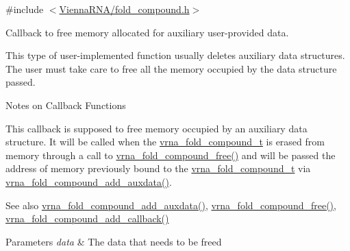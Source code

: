 {\ttfamily \#include $<$\mbox{\hyperlink{fold__compound_8h}{Vienna\+R\+N\+A/fold\+\_\+compound.\+h}}$>$}



Callback to free memory allocated for auxiliary user-\/provided data. 

This type of user-\/implemented function usually deletes auxiliary data structures. The user must take care to free all the memory occupied by the data structure passed.

\begin{DoxyRefDesc}{Notes on Callback Functions}
\item[\mbox{\hyperlink{callbacks__callbacks000002}{Notes on Callback Functions}}]This callback is supposed to free memory occupied by an auxiliary data structure. It will be called when the \mbox{\hyperlink{group__fold__compound_ga1b0cef17fd40466cef5968eaeeff6166}{vrna\+\_\+fold\+\_\+compound\+\_\+t}} is erased from memory through a call to \mbox{\hyperlink{group__fold__compound_ga576a077b418a9c3650e06f8e5d296fc2}{vrna\+\_\+fold\+\_\+compound\+\_\+free()}} and will be passed the address of memory previously bound to the \mbox{\hyperlink{group__fold__compound_ga1b0cef17fd40466cef5968eaeeff6166}{vrna\+\_\+fold\+\_\+compound\+\_\+t}} via \mbox{\hyperlink{group__fold__compound_gafc44c76a1aacf61bfccb8cd698772b98}{vrna\+\_\+fold\+\_\+compound\+\_\+add\+\_\+auxdata()}}. \end{DoxyRefDesc}


\begin{DoxySeeAlso}{See also}
\mbox{\hyperlink{group__fold__compound_gafc44c76a1aacf61bfccb8cd698772b98}{vrna\+\_\+fold\+\_\+compound\+\_\+add\+\_\+auxdata()}}, \mbox{\hyperlink{group__fold__compound_ga576a077b418a9c3650e06f8e5d296fc2}{vrna\+\_\+fold\+\_\+compound\+\_\+free()}}, \mbox{\hyperlink{group__fold__compound_ga680ddfe1e67d1459689b1e92c80b9c4c}{vrna\+\_\+fold\+\_\+compound\+\_\+add\+\_\+callback()}}
\end{DoxySeeAlso}

\begin{DoxyParams}{Parameters}
{\em data} & The data that needs to be free\textquotesingle{}d \\
\hline
\end{DoxyParams}
\mbox{\label{group__fold__compound_gac86036fa8cad1108832335063243cdc8}} 
